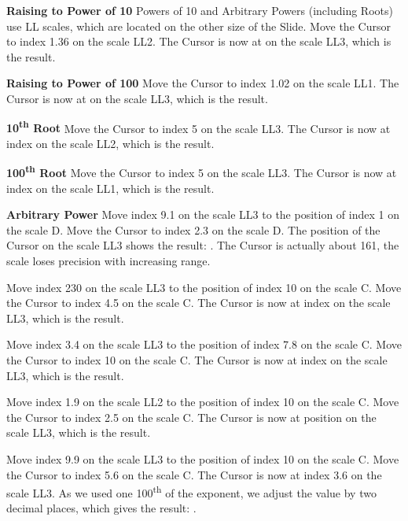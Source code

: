 \begin{multicols*}{3}
{  \textbf{Raising to Power of 10}
\footnotesize Powers of 10 and Arbitrary Powers (including Roots) use LL scales, which are located on the other size of the Slide. \normalsize
Move the Cursor to index 1.36 on the scale LL2.
The Cursor is now at  on the scale LL3, which is the result.

  \textbf{Raising to Power of 100}
Move the Cursor to index 1.02 on the scale LL1.
The Cursor is now at  on the scale LL3, which is the result.

  \textbf{10\textsuperscript{th} Root}
Move the Cursor to index 5 on the scale LL3.
The Cursor is now at index  on the scale LL2, which is the result.

  \textbf{100\textsuperscript{th} Root}
Move the Cursor to index 5 on the scale LL3.
The Cursor is now at index  on the scale LL1, which is the result.

  \textbf{Arbitrary Power}
Move index 9.1 on the scale LL3 to the position of index 1 on the scale D.
Move the Cursor to index 2.3 on the scale D.
The position of the Cursor on the scale LL3 shows the result: . The Cursor is actually about 161, the scale loses precision with increasing range. 

Move index 230 on the scale LL3 to the position of index 10 on the scale C.
Move the Cursor to index 4.5 on the scale C.
The Cursor is now at index  on the scale LL3, which is the result.

Move index 3.4 on the scale LL3 to the position of index 7.8 on the scale C.
Move the Cursor to index 10 on the scale C.
The Cursor is now at index  on the scale LL3, which is the result.

Move index 1.9 on the scale LL2 to the position of index 10 on the scale C.
Move the Cursor to index 2.5 on the scale C.
The Cursor is now at position  on the scale LL3, which is the result.

Move index 9.9 on the scale LL3 to the position of index 10 on the scale C.
Move the Cursor to index 5.6 on the scale C.
The Cursor is now at index 3.6 on the scale LL3.
As we used one 100\textsuperscript{th} of the exponent, we adjust the value by two decimal places, which gives the result: .

}
\end{multicols*}
